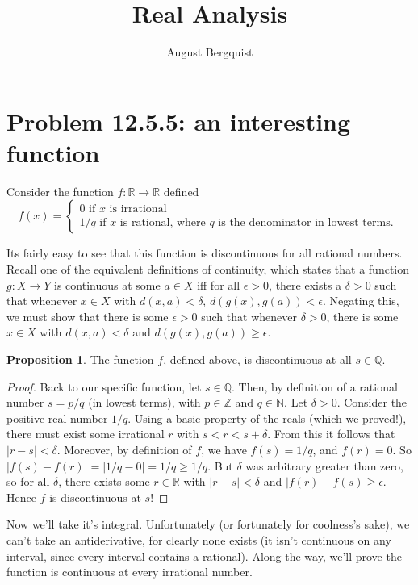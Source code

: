 \documentclass[12pt]{article}
\title{Real Analysis}
\author{August Bergquist}
\newcommand{\R}{\mathbb{R}}
\newcommand{\Z}{\mathbb{Z}}
\newcommand{\N}{\mathbb{N}}
\newcommand{\Q}{\mathbb{Q}}
\theoremstyle{definition}
\newtheorem{proposition}{Proposition}
\begin{document}
\section{Problem 12.5.5: an interesting function} 

Consider the function $f: \R\to \R$ defined 
\[
    f(x) = 
    \begin{cases}
        0 \mbox{ if $x$ is irrational }\\
        1/q \mbox{ if $x$ is rational, where $q$ is the denominator in lowest terms. }
    \end{cases}
    \]

Its fairly easy to see that this function is discontinuous for all rational numbers. Recall one of the equivalent definitions of continuity, which states that a function $g:X\to Y$ is continuous at some $a\in X$ iff for all $\epsilon > 0$, there exists a $\delta > 0$ such that whenever $x\in X$ with $d(x,a) < \delta$, $d(g(x), g(a)) < \epsilon$. Negating this, we must show that there is some $\epsilon > 0$ such that whenever $ \delta > 0 $, there is some $x\in X$ with $d(x,a) < \delta$ and $ d(g(x), g(a)) \ge \epsilon $. 

\begin{proposition}
    The function $f$, defined above, is discontinuous at all $s\in \Q$.
\end{proposition}

\begin{proof}
Back to our specific function, let $s\in \Q$. Then, by definition of a rational number $s = p/q$ (in lowest terms), with $p\in \Z$ and $q\in \N$. Let $\delta > 0$. Consider the positive real number $1/q$. Using a basic property of the reals (which we proved!), there must exist some irrational $r $ with $ s < r < s + \delta$. From this it follows that $ |r - s| < \delta $. Moreover, by definition of $f$, we have $f(s) = 1/q$, and $ f(r) = 0 $. So $|f(s) - f(r)| = |1/q - 0| = 1/q \ge 1/q$. But $\delta$ was arbitrary greater than zero, so for all $\delta$, there exists some $ r\in \R $ with $ |r -s| < \delta $ and $ |f(r) - f(s) \ge \epsilon $. Hence $f$ is discontinuous at $s$!
\end{proof}


Now we'll take it's integral. Unfortunately (or fortunately for coolness's sake), we can't take an antiderivative, for clearly none exists (it isn't continuous on any interval, since every interval contains a rational). Along the way, we'll prove the function is continuous at every irrational number.
\end{document}

